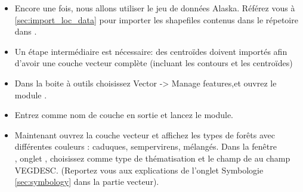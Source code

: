 {\begin{itemize}[label=--]
\item Encore une fois, nous allons utiliser le jeu de  données Alaska. Référez vous à \ref{sec:import_loc_data} pour importer les shapefiles contenus dans le répetoire  dans \grass.
\item Un étape intermédiaire est nécessaire: des centroïdes doivent importés afin d'avoir une couche \grass vecteur complète (incluant les contours et les centroïdes)
\item Dans la boite à outils choisissez Vector -> Manage features,et ouvrez le module .
\item Entrez comme nom de couche en sortie  et lancez le module.
\item Maintenant ouvrez la couche vecteur  et affichez les types de forêts avec différentes couleurs : caduques, sempervirens, mélangés. Dans la fenêtre\\ , onglet  , choisissez  comme type de thématisation et le champ de  au champ VEGDESC. (Reportez vous aux explications de l'onglet Symbologie \ref{sec:symbology} dans la partie vecteur).


\end{itemize}}
